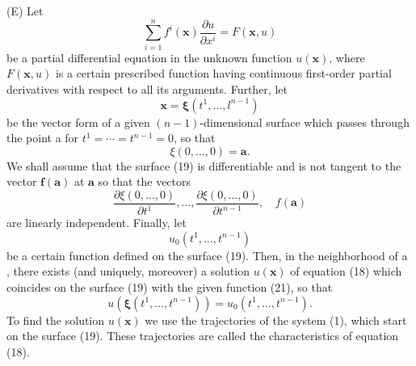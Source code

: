 \documentclass[10pt,a5paper]{book}
\theoremstyle{plain}
\theoremstyle{definition}
\theoremstyle{remark}
\begin{document}
(E) Let
\begin{equation*}
\sum_{i=1}^{n} f^{i}(\mathbf{x}) \frac{\partial u}{\partial x^{i}}=F(\mathbf{x}, u) \tag{18}
\end{equation*}
be a partial differential equation in the unknown function $u(\mathbf{x})$, where $F(\mathbf{x}, u)$ is a certain prescribed function having continuous first-order partial derivatives with respect to all its arguments. Further, let
\begin{equation*}
\mathbf{x}=\boldsymbol{\xi}\left(t^{1}, \ldots, l^{n-1}\right) \tag{19}
\end{equation*}
be the vector form of a given $(n-1)$-dimensional surface which passes through the point a for $t^{1}=\cdots=t^{n-1}=0$, so that
\[
\xi(0, \ldots, 0)=\mathbf{a} .
\]
We shall assume that the surface (19) is differentiable and is not tangent to the vector $\mathbf{f}(\mathbf{a})$ at $\mathbf{a}$ so that the vectors
\begin{equation*}
\frac{\partial \xi(0, \ldots, 0)}{\partial t^{1}}, \ldots, \frac{\partial \xi(0, \ldots, 0)}{\partial t^{n-1}}, \quad f(\mathbf{a}) \tag{20}
\end{equation*}
are linearly independent. Finally, let
\begin{equation*}
u_{0}\left(t^{1}, \ldots, t^{n-1}\right) \tag{21}
\end{equation*}
be a certain function defined on the surface (19). Then, in the neighborhood of a , there exists (and uniquely, moreover) a solution $u(\mathbf{x})$ of equation
(18) which coincides on the surface (19) with the given function (21), so that
\[
u\left(\boldsymbol{\xi}\left(t^{1}, \ldots, t^{n-1}\right)\right)=u_{0}\left(t^{1}, \ldots, t^{n-1}\right) .
\]
To find the solution $u(\mathbf{x})$ we use the trajectories of the system (1), which start on the surface (19). These trajectories are called the characteristics of equation (18).
\end{document}
